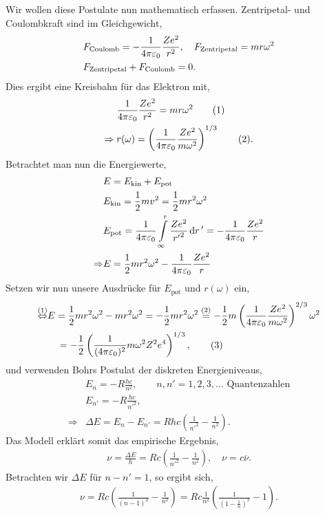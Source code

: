 Wir wollen diese Postulate nun mathematisch erfassen. Zentripetal- und
Coulombkraft sind im Gleichgewicht,
\begin{align*}
&F_{\text{Coulomb}} = -\frac{1}{4\pi\varepsilon_0}\frac{Ze^2}{r^2},\quad
F_{\text{Zentripetal}} = mr\omega^2\\
&F_{\text{Zentripetal}}+F_{\text{Coulomb}} = 0.
\end{align*}
Dies ergibt eine Kreisbahn für das Elektron mit,
\begin{align*}
&\frac{1}{4\pi\varepsilon_0}\frac{Ze^2}{r^2} = mr\omega^2\tag{1}\\
\Rightarrow\;&r(\omega) =
\left(\frac{1}{4\pi\varepsilon_0}\frac{Ze^2}{m\omega^2}\right)^{1/3}\tag{2}.
\end{align*}
Betrachtet man nun die Energiewerte,
\begin{align*}
&E = E_{\text{kin}} + E_{\text{pot}}\\
&E_{\text{kin}} = \frac{1}{2}mv^2 = \frac{1}{2}mr^2\omega^2\\
&E_{\text{pot}} = \frac{1}{4\pi\varepsilon_0}\int\limits_{\infty}^r
\frac{Ze^2}{{r'}^2}\,\mathrm{d} r\,' = -\frac{1}{4\pi\varepsilon_0}\frac{Ze^2}{r}\\
\Rightarrow & E = \frac{1}{2}mr^2\omega^2 - \frac{1}{4\pi\varepsilon_0}\frac{Ze^2}{r}
\end{align*}
Setzen wir nun unsere Ausdrücke für $E_{\text{pot}}$ und $r(\omega)$ ein,
\begin{align*}
\overset{(1)}{\Leftrightarrow} & E = \frac{1}{2}mr^2\omega^2 - mr^2\omega^2 =
-\frac{1}{2}mr^2\omega^2 \overset{(2)}{=}
-\frac{1}{2}m\left(\frac{1}{4\pi\varepsilon_0}\frac{Ze^2}{m\omega^2}\right)^{2/3}\omega^2\\
&\quad 
= -\frac{1}{2}\left(\frac{1}{(4\pi\varepsilon_0)^2}m\omega^2Z^2e^4\right)^{1/3},\tag{3}
\end{align*}
und verwenden Bohrs Postulat der diskreten Energieniveaus,
\begin{align*}
&E_n = -R\frac{hc}{n^2},\qquad n,n'=1,2,3,\ldots\text{ Quantenzahlen}\\
&E_{n'} = -R\frac{hc}{{n'}^2},\\
\Rightarrow & \Delta E = E_n-E_{n'} =
Rhc\left(\frac{1}{{n'}^2}-\frac{1}{n^2}\right).
\end{align*}
Das Modell erklärt somit das empirische Ergebnis,
\begin{align*}
\nu = \frac{\Delta E}{h} = Rc\left(\frac{1}{{n'}^2}-\frac{1}{n^2}\right),\quad
\nu = c\overline{\nu}.
\end{align*}
Betrachten wir $\Delta E$ für $n-n'=1$, so ergibt sich,
\begin{align*}
\nu = Rc\left(\frac{1}{(n-1)^2}-\frac{1}{n^2}\right) = 
Rc\frac{1}{n^2}\left(\frac{1}{\left(1-\frac{1}{n}\right)^2}-1\right).\tag{4}
\end{align*}

